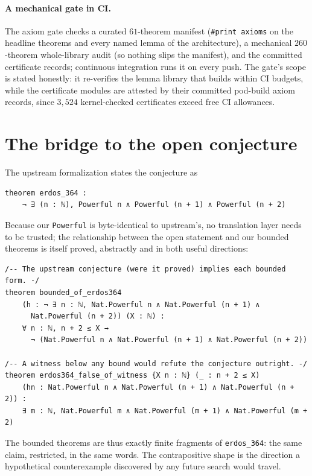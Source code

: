 \documentclass[11pt]{article}
\theoremstyle{definition}
\theoremstyle{remark}
\newcommand{\code}[1]{\texttt{#1}}
\newcommand{\Powerful}{\code{Powerful}}
\begin{document}
\paragraph{A mechanical gate in CI.}
The axiom gate checks a curated $61$-theorem manifest
(\code{\#print axioms} on the headline theorems and every named lemma of
the architecture), a mechanical $260$-theorem whole-library audit (so
nothing slips the manifest), and the committed certificate records;
continuous integration runs it on every push. The gate's scope is stated
honestly: it re-verifies the lemma library that builds within CI budgets,
while the certificate modules are attested by their committed pod-build
axiom records, since $3{,}524$ kernel-checked certificates exceed free CI
allowances.

\section{The bridge to the open conjecture}\label{sec:bridge}

The upstream formalization states the conjecture as
\begin{lstlisting}
theorem erdos_364 :
    ¬ ∃ (n : ℕ), Powerful n ∧ Powerful (n + 1) ∧ Powerful (n + 2)
\end{lstlisting}
Because our \Powerful{} is byte-identical to upstream's, no translation
layer needs to be trusted; the relationship between the open statement
and our bounded theorems is itself proved, abstractly and in both useful
directions:

\begin{lstlisting}
/-- The upstream conjecture (were it proved) implies each bounded form. -/
theorem bounded_of_erdos364
    (h : ¬ ∃ n : ℕ, Nat.Powerful n ∧ Nat.Powerful (n + 1) ∧
      Nat.Powerful (n + 2)) (X : ℕ) :
    ∀ n : ℕ, n + 2 ≤ X →
      ¬ (Nat.Powerful n ∧ Nat.Powerful (n + 1) ∧ Nat.Powerful (n + 2))

/-- A witness below any bound would refute the conjecture outright. -/
theorem erdos364_false_of_witness {X n : ℕ} (_ : n + 2 ≤ X)
    (hn : Nat.Powerful n ∧ Nat.Powerful (n + 1) ∧ Nat.Powerful (n + 2)) :
    ∃ m : ℕ, Nat.Powerful m ∧ Nat.Powerful (m + 1) ∧ Nat.Powerful (m + 2)
\end{lstlisting}

The bounded theorems are thus exactly finite fragments of
\code{erdos\_364}: the same claim, restricted, in the same words. The
contrapositive shape is the direction a hypothetical counterexample
discovered by any future search would travel.
\end{document}
